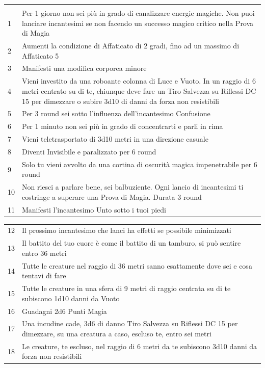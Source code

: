 \begin{multicols}{2}
\noindent\begin{tabularx}{0.5\textwidth}{lX}
\hline\\
1 & Per 1 giorno non sei più in grado di canalizzare energie magiche. Non puoi lanciare incantesimi se non facendo un successo magico critico nella Prova di Magia\\
2 & Aumenti la condizione di Affaticato di 2 gradi, fino ad un massimo di Affaticato 5\\
3 & Manifesti una modifica corporea minore\\
4 & Vieni investito da una roboante colonna di Luce e Vuoto. In un raggio di 6 metri centrato su di te, chiunque deve fare un Tiro Salvezza su Riflessi DC 15 per dimezzare o subire 3d10 di danni da forza non resistibili\\
5 & Per 3 round sei sotto l'influenza dell'incantesimo Confusione\\
6 & Per 1 minuto non sei più in grado di concentrarti e parli in rima\\
7 & Vieni teletrasportato di 3d10 metri in una direzione casuale\\
8 & Diventi Invisibile e paralizzato per 6 round\\
9 & Solo tu vieni avvolto da una cortina di oscurità magica impenetrabile per 6 round\\
10 & Non riesci a parlare bene, sei balbuziente. Ogni lancio di incantesimi ti costringe a superare una Prova di Magia. Durata 3 round\\
11 & Manifesti l'incantesimo Unto sotto i tuoi piedi\\
\end{tabularx} 
\noindent\begin{tabularx}{0.5\textwidth}{lX}
12 & Il prossimo incantesimo che lanci ha effetti se possibile minimizzati\\
13 & Il battito del tuo cuore è come il battito di un tamburo, si può sentire entro 36 metri\\
14 & Tutte le creature nel raggio di 36 metri sanno esattamente dove sei e cosa tentavi di fare\\
15 & Tutte le creature in una sfera di 9 metri di raggio centrata su di te subiscono 1d10 danni da Vuoto\\
16 & Guadagni 2d6 Punti Magia\\
17 & Una incudine cade, 3d6 di danno Tiro Salvezza su Riflessi DC 15 per dimezzare, su una creatura a caso, escluso te, entro sei metri\\
18 & Le creature, te escluso, nel raggio di 6 metri da te subiscono 3d10 danni da forza non resistibili
\end{tabularx} 



\end{multicols}
